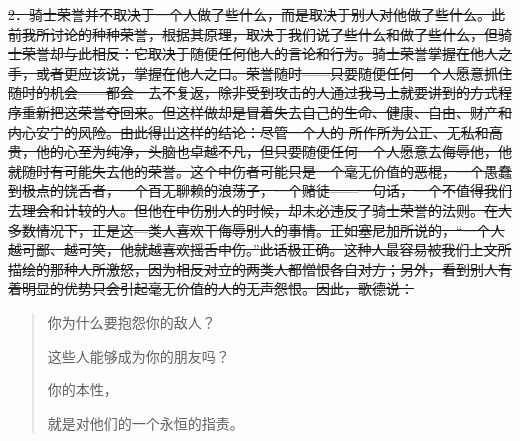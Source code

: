 \documentclass[12pt,oneside]{book}
\begin{document}
\sout{2．骑士荣誉并不取决于一个人做了些什么，而是取决于别人对他做了些什么。此前我所讨论的种种荣誉，根据其原理，取决于我们说了些什么和做了些什么，但骑士荣誉却与此相反：它取决于随便任何他人的言论和行为。骑士荣誉掌握在他人之手，或者更应该说，掌握在他人之口。荣誉随时——只要随便任何一个人愿意抓住随时的机会——都会一去不复返，除非受到攻击的人通过我马上就要讲到的方式程序重新把这荣誉夺回来。但这样做却是冒着失去自己的生命、健康、自由、财产和内心安宁的风险。由此得出这样的结论：尽管一个人的
所作所为公正、无私和高贵，他的心至为纯净，头脑也卓越不凡，但只要随便任何一个人愿意去侮辱他，他就随时有可能失去他的荣誉。这个中伤者可能只是一个毫无价值的恶棍，一个愚蠢到极点的饶舌者，一个百无聊赖的浪荡子，一个赌徒——一句话，一个不值得我们去理会和计较的人。但他在中伤别人的时候，却未必违反了骑士荣誉的法则。在大多数情况下，正是这—类人喜欢干侮辱别人的事情。正如塞尼加所说的，“一个人越可鄙、越可笑，他就越喜欢摇舌中伤。”此话极正确。这种人最容易被我们上文所描绘的那种人所激怒，因为相反对立的两类人都憎恨各自对方；另外，看到别人有着明显的优势只会引起毫无价值的人的无声怨恨。因此，歌德说： }

 
\begin{quotation}
你为什么要抱怨你的敌人？ 

这些人能够成为你的朋友吗？ 

你的本性， 

就是对他们的一个永恒的指责。 
\end{quotation}
\end{document}
